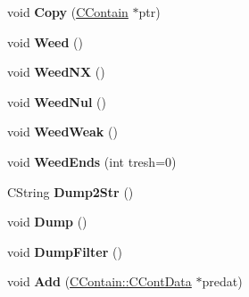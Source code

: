 \begin{DoxyCompactItemize}
\item 
\hypertarget{class_c_contain_aa26df54647b7399a4b0c8e1de756162c}{void {\bfseries Copy} (\hyperlink{class_c_contain}{C\-Contain} $\ast$ptr)}\label{class_c_contain_aa26df54647b7399a4b0c8e1de756162c}

\item 
\hypertarget{class_c_contain_a9a0da0a3cf60666881a124a9caa9cdbc}{void {\bfseries Weed} ()}\label{class_c_contain_a9a0da0a3cf60666881a124a9caa9cdbc}

\item 
\hypertarget{class_c_contain_ae453bde51b16d80758fed557156f2805}{void {\bfseries Weed\-N\-X} ()}\label{class_c_contain_ae453bde51b16d80758fed557156f2805}

\item 
\hypertarget{class_c_contain_ac10f9e910af6e79ab1cf92de9d1ca175}{void {\bfseries Weed\-Nul} ()}\label{class_c_contain_ac10f9e910af6e79ab1cf92de9d1ca175}

\item 
\hypertarget{class_c_contain_a63673ac357c4def989ac81e2fde959fa}{void {\bfseries Weed\-Weak} ()}\label{class_c_contain_a63673ac357c4def989ac81e2fde959fa}

\item 
\hypertarget{class_c_contain_abcc26b1b07665fb63d33e51f8388939d}{void {\bfseries Weed\-Ends} (int tresh=0)}\label{class_c_contain_abcc26b1b07665fb63d33e51f8388939d}

\item 
\hypertarget{class_c_contain_a8dba669bf91c41e0fcd38dd74a011c2d}{C\-String {\bfseries Dump2\-Str} ()}\label{class_c_contain_a8dba669bf91c41e0fcd38dd74a011c2d}

\item 
\hypertarget{class_c_contain_abd5c8bf8f6b221b87d32ca95c5f95d0e}{void {\bfseries Dump} ()}\label{class_c_contain_abd5c8bf8f6b221b87d32ca95c5f95d0e}

\item 
\hypertarget{class_c_contain_afdeab8945cad15a691899e438eb3fb0e}{void {\bfseries Dump\-Filter} ()}\label{class_c_contain_afdeab8945cad15a691899e438eb3fb0e}

\item 
\hypertarget{class_c_contain_aa20979c5759ae6838f90f9a7197e1d76}{void {\bfseries Add} (\hyperlink{class_c_contain_1_1_c_cont_data}{C\-Contain\-::\-C\-Cont\-Data} $\ast$predat)}\label{class_c_contain_aa20979c5759ae6838f90f9a7197e1d76}


\end{DoxyCompactItemize}
